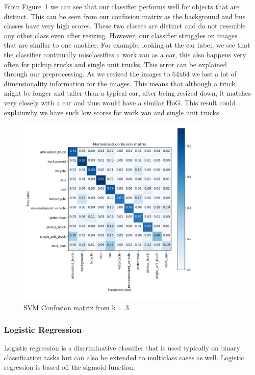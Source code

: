 \documentclass[12pt]{article}
\begin{document}
From Figure~\ref{fig:plots/confusion_2} we can see that our classifier performs well for objects that are distinct. This can be seen from our confusion matrix as the background and bus classes have very high scores. These two classes are distinct and do not resemble any other class even after resizing. However, our classifier struggles on images that are similar to one another. For example, looking at the car label, we see that the classifier continually misclassifies a work van as a car, this also happens very often for pickup trucks and single unit trucks. This error can be explained through our preprocessing. As we resized the images to 64x64 we lost a lot of dimensionality information for the images. This means that although a truck might be longer and taller than a typical car, after being resized down, it matches very closely with a car and thus would have a similar HoG. This result could explainwhy we have such low scores for work van and single unit trucks.

\begin{figure}[H]
    \centering
    \includegraphics[width=0.85\textwidth]{plots/confusion_2.jpg}
    \caption{SVM Confusion matrix from k = 3}
    \label{fig:plots/confusion_2}
\end{figure}

\subsubsection{Logistic Regression}
Logistic regression is a discriminative classifier that is used typically on binary classification tasks but can also be extended to multiclass cases as well. Logistic regression is based off the sigmoid function, 
\end{document}
